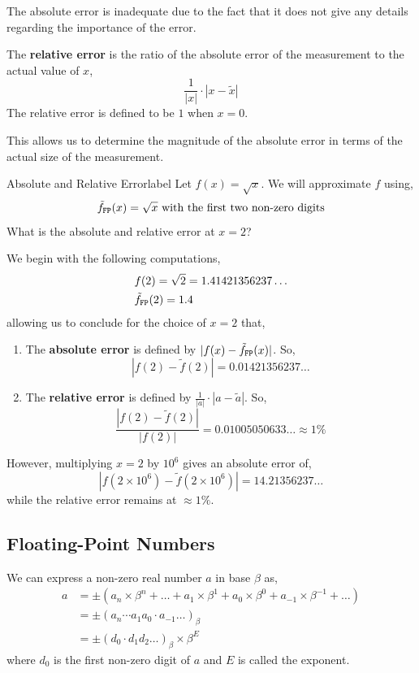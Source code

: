 \begin{rmk}
    \sloppy The absolute error is inadequate due to the fact that it does not give any details regarding the importance of the error.
\end{rmk}

\begin{defn}
    \sloppy The \textbf{relative error} is the ratio of the absolute error of the measurement to the actual value of $x$,
    \[\frac{1}{|x|} \cdot |x-\tilde{x}|\]
    The relative error is defined to be $1$ when $x = 0$.
\end{defn}

\begin{rmk}
    \sloppy This allows us to determine the magnitude of the absolute error in terms of the actual size of the measurement.
\end{rmk}

\begin{ex}{Absolute and Relative Error}{label}
    Let $f(x) = \sqrt{x}$. We will approximate $f$ using,
    \[\tilde{f}_{\texttt{FP}}(x) = \sqrt{x} \text{ with the first two non-zero digits}\]
    What is the absolute and relative error at $x = 2$?
    
    \LineBreak
    
    We begin with the following computations,
    \begin{align*}
    &f(2)=\sqrt{2}=1.41421356237 \ldots \\
    &\tilde{f}_{\texttt{FP}}(2)=1.4
    \end{align*}
    allowing us to conclude for the choice of $x = 2$ that,
    \begin{enumerate}
        \item The \textbf{absolute error} is defined by $|f(x) - \tilde{f}_{\texttt{FP}}(x)|$. So,
        \[|f(2)-\tilde{f}(2)|=0.01421356237 \ldots\]
        \item The \textbf{relative error} is defined by $\frac{1}{|a|} \cdot |a-\tilde{a}|$. So,
        \[\frac{|f(2)-\tilde{f}(2)|}{|f(2)|}=0.01005050633 \ldots \approx 1 \%\]
    \end{enumerate}
    However, multiplying $x = 2$ by $10^6$ gives an absolute error of,
    \[\left|f\left(2 \times 10^6\right)-\tilde{f}\left(2 \times 10^6\right)\right|=14.21356237 \ldots\]
    while the relative error remains at $\approx 1 \%$.
\end{ex}

\subsection{Floating-Point Numbers}
We can express a non-zero real number $a$ in base $\beta$ as,
\begin{align*}
    a &=\pm\left(a_n \times \beta^n+\ldots+a_1 \times \beta^1+a_0 \times \beta^0+a_{-1} \times \beta^{-1}+\ldots\right) \\
    &=\pm\left(a_n \cdots a_1 a_0 \cdot a_{-1} \ldots\right)_\beta \\
    &=\pm\left(d_0 \cdot d_1 d_2 \ldots\right)_\beta \times \beta^E
\end{align*}
where $d_0$ is the first non-zero digit of $a$ and $E$ is called the exponent.

